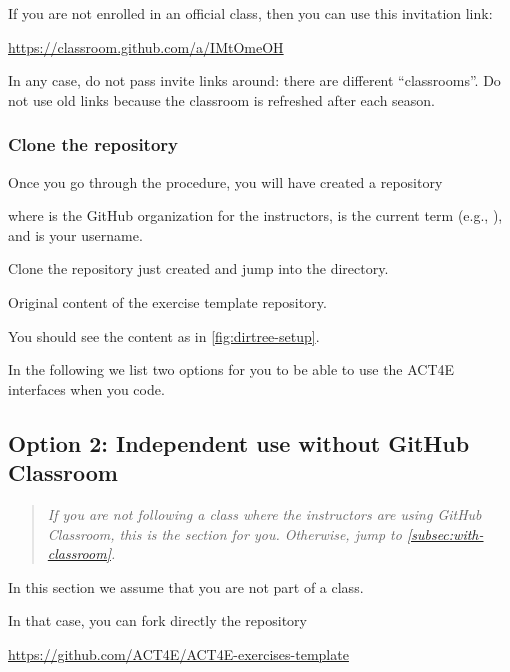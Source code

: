 If you are not enrolled in an official class, then you can use this invitation link:

\url{https://classroom.github.com/a/IMtOmeOH}

In any case, do not pass invite links around: there are different ``classrooms''.
Do not use old links because the classroom is refreshed after each season.

\subsubsection{Clone the repository}

Once you go through the procedure, you will have created a repository
%
\begin{quote}
\end{quote}
where  is the GitHub organization for the instructors,  is the current term (e.g., ), and  is your username.

Clone the repository just created and jump into the directory.

\begin{marginfigure}
    \caption{Original content of the exercise template repository.}
    \label{fig:dirtree-setup}
\end{marginfigure}

You should see the content as in \cref{fig:dirtree-setup}.

In the following we list two options for you to be able to use the ACT4E interfaces when you code.

\subsection{Option 2: Independent use without GitHub Classroom}
\label{subsec:without-classroom}

\begin{quote}
    \emph{
        If you are \emph{not} following a class where the instructors are using GitHub Classroom,
        this is the section for you.
        Otherwise, jump to \cref{subsec:with-classroom}.
    }
\end{quote}

In this section we assume that you are not part of a class.

In that case, you can fork directly the repository

\url{https://github.com/ACT4E/ACT4E-exercises-template}


